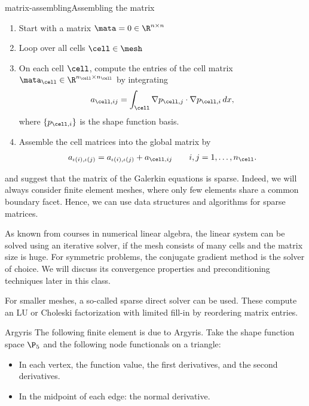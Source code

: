 \begin{Algorithm*}{matrix-assembling}{Assembling the matrix}
  \begin{enumerate}
  \item Start with a matrix $\mata = 0 \in \R^{n\times n}$
  \item Loop over all cells $\cell\in\mesh$
  \item On each cell $\cell$, compute the entries of the cell matrix
    $\mata_\cell \in \R^{n_\cell\times n_\cell}$ by integrating
    \begin{gather}
      a_{\cell,ij} = \int_\cell \nabla p_{\cell,j}\cdot\nabla p_{\cell,i}\,dx,
    \end{gather}
    where $\{p_{\cell,i}\}$ is the shape function basis.
  \item Assemble the cell matrices into the global matrix by
    \begin{gather}
      a_{\iota(i),\iota(j)} = a_{\iota(i),\iota(j)} + a_{\cell,ij}
      \qquad i,j = 1,\dots,n_\cell.
    \end{gather}
  \end{enumerate}
\end{Algorithm*}

\begin{remark}
   and
   suggest that the matrix of
  the Galerkin equations is sparse. Indeed, we will always consider
  finite element meshes, where only few elements share a common
  boundary facet. Hence, we can use data structures and algorithms for
  sparse matrices.
\end{remark}

\begin{remark}
  As known from courses in numerical linear algebra, the linear system
  can be solved using an iterative solver, if the mesh consists of
  many cells and the matrix size is huge. For symmetric problems, the
  conjugate gradient method is the solver of choice. We will discuss
  its convergence properties and preconditioning techniques later in
  this class.

  For smaller meshes, a so-called sparse direct solver can be
  used. These compute an LU or Choleski factorization with limited
  fill-in by reordering matrix entries.
\end{remark}

\begin{Example}{Argyris}
  The following finite element is due to Argyris. Take the shape
  function space $\P_5$ and the following node functionals on a
  triangle:
  \begin{itemize}
  \item In each vertex, the function value, the first derivatives, and the second derivatives.
  \item In the midpoint of each edge: the normal derivative.
  \end{itemize}
\end{Example}

